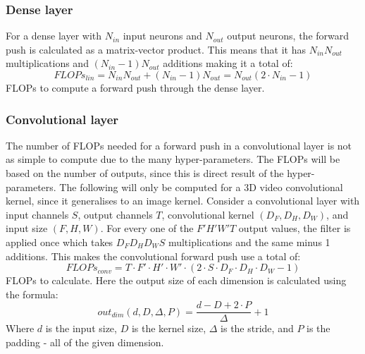 \subsubsection{Dense layer}
For a dense layer with $N_{in}$ input neurons and $N_{out}$ output neurons, the forward push is calculated as a matrix-vector product. This means that it has $N_{in}N_{out}$ multiplications and $(N_{in}-1)N_{out}$ additions making it a total of:
\begin{equation}
    FLOPs_{lin} = N_{in}N_{out} + (N_{in}-1)N_{out} = N_{out} (2\cdot N_{in}-1)
\end{equation}
FLOPs to compute a forward push through the dense layer.

\subsubsection{Convolutional layer}
The number of FLOPs needed for a forward push in a convolutional layer is not as simple to compute due to the many hyper-parameters. The FLOPs will be based on the number of outputs, since this is direct result of the hyper-parameters. The following will only be computed for a 3D video convolutional kernel, since it generalises to an image kernel. Consider a convolutional layer with input channels $S$, output channels $T$, convolutional kernel $(D_F, D_H, D_W)$, and input size $(F, H, W)$. For every one of the $F' H' W' T$ output values, the filter is applied once which takes $D_F D_H D_W S$ multiplications and the same minus 1 additions. This makes the convolutional forward push use a total of:
\begin{equation}
    FLOPs_{conv} = T\cdot F'\cdot H'\cdot W'\cdot (2\cdot S \cdot D_F\cdot D_H\cdot D_W - 1)
\end{equation}
FLOPs to calculate. Here the output size of each dimension is calculated using the formula:
\begin{equation}
    out_{dim}(d, D, \Delta, P) = \frac{d - D + 2\cdot P}{\Delta} + 1
\end{equation}
Where $d$ is the input size, $D$ is the kernel size, $\Delta$ is the stride, and $P$ is the padding - all of the given dimension.

